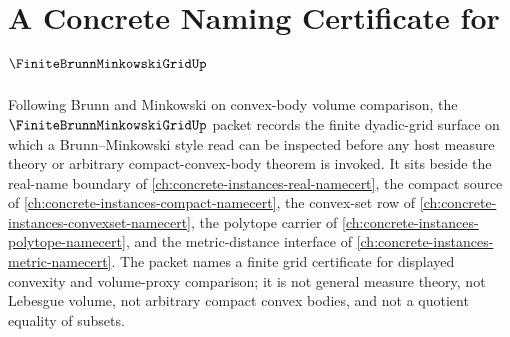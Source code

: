 \chapter{A Concrete Naming Certificate for $\FiniteBrunnMinkowskiGridUp$}
\label{ch:concrete-instances-finite-brunn-minkowski-grid-namecert}

Following Brunn and Minkowski on convex-body volume comparison, the $\FiniteBrunnMinkowskiGridUp$ packet records the finite dyadic-grid surface on which a Brunn--Minkowski style read can be inspected before any host measure theory or arbitrary compact-convex-body theorem is invoked. It sits beside the real-name boundary of \autoref{ch:concrete-instances-real-namecert}, the compact source of \autoref{ch:concrete-instances-compact-namecert}, the convex-set row of \autoref{ch:concrete-instances-convexset-namecert}, the polytope carrier of \autoref{ch:concrete-instances-polytope-namecert}, and the metric-distance interface of \autoref{ch:concrete-instances-metric-namecert}. The packet names a finite grid certificate for displayed convexity and volume-proxy comparison; it is not general measure theory, not Lebesgue volume, not arbitrary compact convex bodies, and not a quotient equality of subsets.

